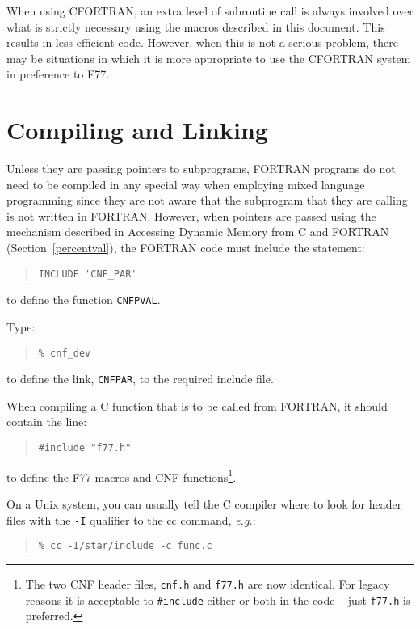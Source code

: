 \documentclass[twoside,11pt]{article}
\newcommand{\htmlref}[2]{#1}
\newcommand{\latex}[1]{#1}
\newcommand{\xlabel}[1]{}
\renewcommand{\_}{\texttt{\symbol{95}}}
\begin{document}
When using CFORTRAN, an extra level of subroutine call is always involved over
what is strictly necessary using the macros described in this document. This
results in less efficient code. However, when this is not a serious problem,
there may be situations in which it is more appropriate to use the CFORTRAN
system in preference to F77.

\section{\xlabel{compiling_and_linking}Compiling and Linking\label{compiling_and_linking}}

Unless they are passing pointers to subprograms, FORTRAN programs do not need 
to be compiled in any special way when employing mixed language programming
since they are not aware that the subprogram that they are calling is not 
written in FORTRAN\@. However, when pointers are passed using the mechanism
described in
\htmlref{Accessing Dynamic Memory from C and
FORTRAN}{percentval}\latex{ (Section~\ref{percentval})},
the FORTRAN code must include the statement:
\begin{quote}\begin{verbatim}
INCLUDE 'CNF_PAR'
\end{verbatim}\end{quote}
to define the function \texttt{CNF\_PVAL}.

Type:
\begin{quote}\begin{verbatim}
% cnf_dev
\end{verbatim}\end{quote}
to define the link, \texttt{CNF\_PAR}, to the required include file.

When compiling a C function that is
to be called from FORTRAN, it should contain the line:

\begin{quote}
\texttt{\#include "f77.h"}
\end{quote}

to define the F77 macros and CNF functions\footnote{The two CNF header files, 
\texttt{cnf.h} and \texttt{f77.h} are now identical. For legacy reasons
it is acceptable to \texttt{\#include} either or both in the code -- just
\texttt{f77.h} is preferred.}.

On a Unix system, you can usually tell the C compiler where to look for 
header files with the \texttt{-I} qualifier to the cc command,
\textit{e.g.}:

\begin{quote}\begin{verbatim}
% cc -I/star/include -c func.c
\end{verbatim}\end{quote}
\end{document}

